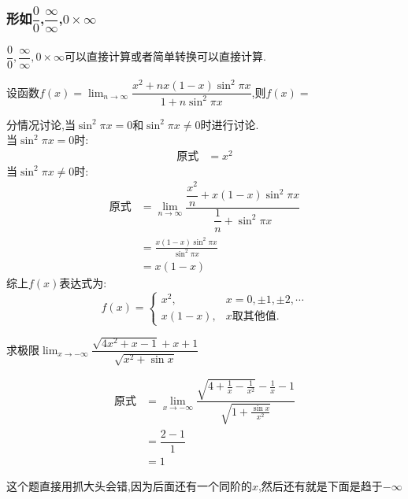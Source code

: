 \documentclass[8pt a4paper, oneside, UTF8]{ctexbook}
\begin{document}
\begin{sloppypar}
    \subsubsection{形如$\dfrac{0}{0}$,$\dfrac{\infty}{\infty}$,$0 \times \infty$}
         $\dfrac{0}{0},\dfrac{\infty}{\infty},0 \times \infty$可以直接计算或者简单转换可以直接计算.
    \begin{problem}
        设函数$f(x)=\operatorname*{lim}_{n\to\infty} \dfrac{x^2+nx(1-x)\sin^2\pi x}{1+n\sin^{2}\pi x}$,则$f(x)=$        
    \end{problem}
    \begin{solution}
        分情况讨论,当$\sin^2 \pi x=0$和$\sin^2 \pi x \neq 0$时进行讨论.\\
        当$\sin^2 \pi x=0$时:
        \begin{align*}
          \text{原式} & = x^2
        \end{align*}
        当$\sin^2 \pi x \neq 0$时:
        \begin{align*}
          \text{原式} & =\lim_{n\to\infty}\dfrac{\dfrac{x^{2}}{n}+x(1-x)\sin^{2}\pi x}{\dfrac{1}{n}+\sin^{2}\pi x}\\
          & =\frac{x(1-x)\sin^{2}\pi x}{\sin^{2}\pi x}\\
          & =x(1-x)    
        \end{align*}
        综上$f(x)$表达式为: $$f(x)=\begin{cases}x^2,&x=0, \pm1, \pm2, \cdots\\x(1-x),&x\text{取其他值}.\end{cases}$$
    \end{solution}
    \begin{problem}
        求极限$\lim_{x\to-\infty}\dfrac{\sqrt{4x^2+x-1}+x+1}{\sqrt{x^2+\sin x}}$
    \end{problem}
    \begin{solution}
        \begin{align*}
          \text{原式} & = \lim_{x\to-\infty} \dfrac{\sqrt{4+\frac{1}{x}-\frac{1}{x^2}}-\frac{1}{x}-1}{\sqrt{1+\frac{\sin x}{x^2}}}\\
          & =  \dfrac{2-1}{1}\\
          & = 1
        \end{align*}
    \end{solution}
    \begin{note}
        这个题直接用抓大头会错,因为后面还有一个同阶的$x$,然后还有就是下面是趋于$- \infty$
    \end{note}

\end{sloppypar}
\end{document}
